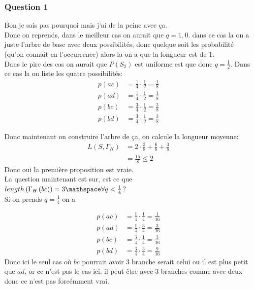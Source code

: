 

    \subsubsection{Question 1}
    Bon je sais pas pourquoi mais j'ai de la peine avec ça.\\
    Donc on reprends, dans le meilleur cas on aurait que $q = 1, 0$. dans ce cas la on a juste l'arbre de base avec deux possibilités, donc quelque soit les probabilité (qu'on connaît en l'occurrence) alors la on a que la longueur est de $1$.\\
Dans le pire des cas on aurait que $P\left(S_2\right)$ est uniforme est que donc $q = \frac{1}{2}$. Dans ce cas la on liste les quatre possibilités:
\begin{align*} 
    p\left(ac\right) &= \frac{1}{4} \cdot  \frac{1}{2} = \frac{1}{8}\\
    p \left(ad\right) &= \frac{1}{4} \cdot  \frac{1}{2} = \frac{1}{8}\\
    p\left(bc\right) &= \frac{3}{4} \cdot  \frac{1}{2} =  \frac{3}{8}\\
    p\left(bd\right) &= \frac{3}{4} \cdot  \frac{1}{2} = \frac{3}{8}
\end{align*}

Donc maintenant on construire l'arbre de ça, on calcule la longueur moyenne:
\begin{align*} 
    L\left(S, \Gamma_H\right) &=2 \cdot  \frac{3}{8} + \frac{6}{8} + \frac{3}{8}\\
 &= \frac{15}{8} \leq 2
\end{align*}
Donc oui la première proposition est vraie.\\
La question maintenant est sur, est ce que $length\left(\Gamma_H\left(bc\right)\right) = 3 \mathspace \forall q < \frac{1}{4}$?\\
Si on prends $q =  \frac{1}{4}$ on a


\begin{align*} 
    p\left(ac\right) &= \frac{1}{4} \cdot  \frac{1}{4} = \frac{1}{16}\\
    p \left(ad\right) &= \frac{1}{4} \cdot  \frac{3}{4} = \frac{3}{16}\\
    p\left(bc\right) &= \frac{3}{4} \cdot  \frac{1}{4} =  \frac{3}{16}\\
    p\left(bd\right) &= \frac{3}{4} \cdot  \frac{3}{4} = \frac{9}{16}
\end{align*}
Donc ici le seul cas où $bc$ pourrait avoir 3 branche serait celui ou il est plus petit que $ad$, or ce n'est pas le cas ici, il peut être avec 3 branches comme avec deux donc ce n'est pas forcémment vrai.\\
